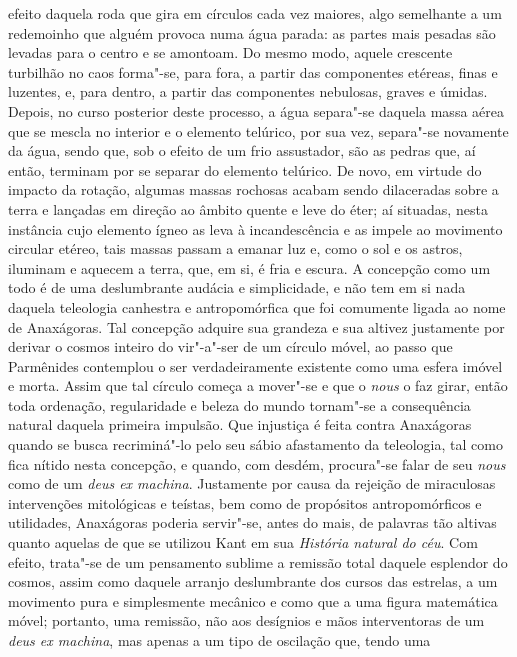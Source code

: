 efeito daquela roda que gira em círculos cada vez maiores, algo semelhante a
um redemoinho que alguém provoca numa água parada: as partes mais pesadas são
levadas para o centro e se amontoam. Do mesmo modo, aquele crescente
turbilhão no caos forma"-se, para fora, a partir das componentes etéreas,
finas e luzentes, e, para dentro, a partir das componentes nebulosas, graves
e úmidas. Depois, no curso posterior deste processo, a água separa"-se
daquela massa aérea que se mescla no interior e o elemento telúrico, por sua
vez, separa"-se novamente da água, sendo que, sob o efeito de um frio
assustador, são as pedras que, aí então, terminam por se separar do elemento
telúrico. De novo, em virtude do impacto da rotação, algumas massas rochosas
acabam sendo dilaceradas sobre a terra e lançadas em direção ao âmbito quente
e leve do éter; aí situadas, nesta instância cujo elemento ígneo as leva à
incandescência e as impele ao movimento circular etéreo, tais massas passam a
emanar luz e, como o sol e os astros, iluminam e aquecem a terra, que, em si,
é fria e escura. A concepção como um todo é de uma deslumbrante audácia e
simplicidade, e não tem em si nada daquela teleologia canhestra e
antropomórfica que foi comumente ligada ao nome de Anaxágoras. Tal concepção
adquire sua grandeza e sua altivez justamente por derivar o cosmos inteiro do
vir"-a"-ser de um círculo móvel, ao passo que Parmênides contemplou o ser
verdadeiramente existente como uma esfera imóvel e morta. Assim que tal
círculo começa a mover"-se e que o \textit{nous} o faz girar, então toda
ordenação, regularidade e beleza do mundo tornam"-se a consequência natural
daquela primeira impulsão. Que injustiça é feita contra Anaxágoras quando se
busca recriminá"-lo pelo seu sábio afastamento da teleologia, tal como fica
nítido nesta concepção, e quando, com desdém, procura"-se falar de
seu \textit{nous} como de um \textit{deus ex machina}. Justamente por \label{exmachina} 
causa da rejeição de miraculosas intervenções mitológicas e
teístas, bem como de propósitos antropomórficos e utilidades, Anaxágoras
poderia servir"-se, antes do mais, de palavras tão altivas quanto aquelas de
que se utilizou Kant em sua \textit{História natural do céu}. Com efeito,
trata"-se de um pensamento sublime a remissão total daquele esplendor do
cosmos, assim como daquele arranjo deslumbrante dos cursos das estrelas, a um
movimento pura e simplesmente mecânico e como que a uma figura matemática
móvel; portanto, uma remissão, não aos desígnios e mãos interventoras de
um \textit{deus ex machina}, mas apenas a um tipo de oscilação que, tendo uma
